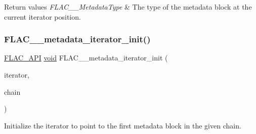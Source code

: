 \begin{DoxyRetVals}{Return values}
{\em F\+L\+A\+C\+\_\+\+\_\+\+Metadata\+Type} & The type of the metadata block at the current iterator position. \\
\hline
\end{DoxyRetVals}
\mbox{\label{group__flac__metadata__level2_ga4a5af69a1f19436b02f738eb8c97c959}} 
\subsubsection{\texorpdfstring{F\+L\+A\+C\+\_\+\+\_\+metadata\+\_\+iterator\+\_\+init()}{FLAC\_\_metadata\_iterator\_init()}}
{\footnotesize\ttfamily \hyperlink{group__flac__export_ga56ca07df8a23310707732b1c0007d6f5}{F\+L\+A\+C\+\_\+\+A\+PI} \hyperlink{png_8h_ac9c84fa68bbad002983e35ce3663c686}{void} F\+L\+A\+C\+\_\+\+\_\+metadata\+\_\+iterator\+\_\+init (\begin{DoxyParamCaption}\item[{\hyperlink{group__flac__metadata__level2_ga9f3e135a07cdef7e51597646aa7b89b2}{F\+L\+A\+C\+\_\+\+\_\+\+Metadata\+\_\+\+Iterator} $\ast$}]{iterator,  }\item[{\hyperlink{group__flac__metadata__level2_gaec6993c60b88f222a52af86f8f47bfdf}{F\+L\+A\+C\+\_\+\+\_\+\+Metadata\+\_\+\+Chain} $\ast$}]{chain }\end{DoxyParamCaption})}

Initialize the iterator to point to the first metadata block in the given chain.


